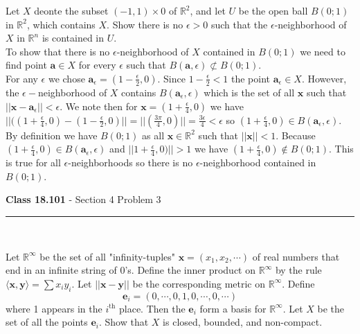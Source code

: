 \documentclass[11pt,reqno]{article}
\begin{document}
Let $X$ deonte the subset $(-1,1) \times 0$ of $\mathbb{R}^2$, and let $U$ be the open ball $B(0;1)$ in $\mathbb{R}^2$, which contains $X$. Show there is no $\epsilon > 0$ such that the $\epsilon$-neighborhood of $X$ in $\mathbb{R}^n$ is contained in $U$. \\

To show that there is no $\epsilon$-neighborhood of $X$ contained in $B(0;1)$ we need to find point $\textbf{a} \in X$ for every $\epsilon$ such that $B(\textbf{a},\epsilon) \not\subset B(0;1)$.\\
For any $\epsilon$ we chose $\textbf{a}_\epsilon = (1-\frac{\epsilon}{2},0)$. Since $1 - \frac{\epsilon}{2} < 1$ the point $\textbf{a}_\epsilon \in X$. However, the $\epsilon-$neighborhood of $X$ contains $B(\textbf{a}_\epsilon,\epsilon)$ which is the set of all $\textbf{x}$ such that $||\textbf{x}-\textbf{a}_\epsilon|| < \epsilon$. We note then for $\textbf{x} = (1+\frac{\epsilon}{4},0)$ we have $||((1+\frac{\epsilon}{4},0) - (1-\frac{\epsilon}{2},0)|| = ||(\frac{3 \pi}{4},0)|| = \frac{3 \epsilon}{4} < \epsilon$ so $ (1+\frac{\epsilon}{4},0) \in B(\textbf{a}_\epsilon,\epsilon)$.\\
\indent By definition we have $B(0;1)$ as all $\textbf{x} \in \mathbb{R}^2$ such that $||\textbf{x}|| < 1$. Because $(1+\frac{\epsilon}{4},0) \in B(\textbf{a}_\epsilon,\epsilon)$ and $||1+\frac{\epsilon}{4},0)|| > 1$ we have $(1+\frac{\epsilon}{4},0) \notin B(0;1)$. This is true for all $\epsilon$-neighborhoods so there is no $\epsilon$-neighborhood contained in $B(0;1)$.

\begin{flushleft} 
\textbf{Class 18.101} - Section 4 Problem 3\\
\rule{500pt}{1pt}\\
\end{flushleft} 

Let $\mathbb{R}^\infty$ be the set of all "infinity-tuples" $\textbf{x} = (x_1,x_2,\cdots)$ of real numbers that end in an infinite string of 0's. Define the inner product on $\mathbb{R}^\infty$ by the rule $\langle \textbf{x},\textbf{y} \rangle = \sum x_i y_i$.  Let $||\textbf{x} - \textbf{y}||$ be the corresponding metric on $\mathbb{R}^\infty$. Define
\[ \textbf{e}_i = (0,\cdots,0,1,0,\cdots,0,\cdots) \]
where 1 appears in the $i^{\text{th}}$ place. Then the $\textbf{e}_i$ form a basis for $\mathbb{R}^\infty$. Let $X$ be the set of all the points $\textbf{e}_i$. Show that $X$ is closed, bounded, and non-compact.\\
\end{document}
